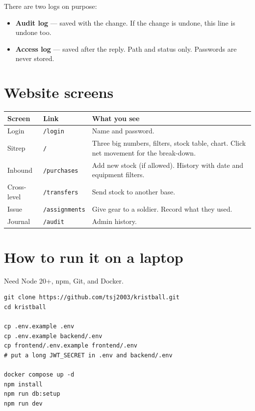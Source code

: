 \documentclass[11pt,a4paper]{article}
\begin{document}
There are two logs on purpose:

\begin{itemize}
  \item \textbf{Audit log} --- saved with the change. If the change is undone, this line is undone too.
  \item \textbf{Access log} --- saved after the reply. Path and status only. Passwords are never stored.
\end{itemize}

\section{Website screens}

\begin{center}
\begin{tabular}{llp{7.4cm}}
\toprule
\textbf{Screen} & \textbf{Link} & \textbf{What you see} \\
\midrule
Login & \texttt{/login} & Name and password. \\
Sitrep & \texttt{/} & Three big numbers, filters, stock table, chart. Click net movement for the break-down. \\
Inbound & \texttt{/purchases} & Add new stock (if allowed). History with date and equipment filters. \\
Cross-level & \texttt{/transfers} & Send stock to another base. \\
Issue & \texttt{/assignments} & Give gear to a soldier. Record what they used. \\
Journal & \texttt{/audit} & Admin history. \\
\bottomrule
\end{tabular}
\end{center}

\section{How to run it on a laptop}

Need Node 20+, npm, Git, and Docker.

\begin{lstlisting}
git clone https://github.com/tsj2003/kristball.git
cd kristball

cp .env.example .env
cp .env.example backend/.env
cp frontend/.env.example frontend/.env
# put a long JWT_SECRET in .env and backend/.env

docker compose up -d
npm install
npm run db:setup
npm run dev
\end{lstlisting}
\end{document}
